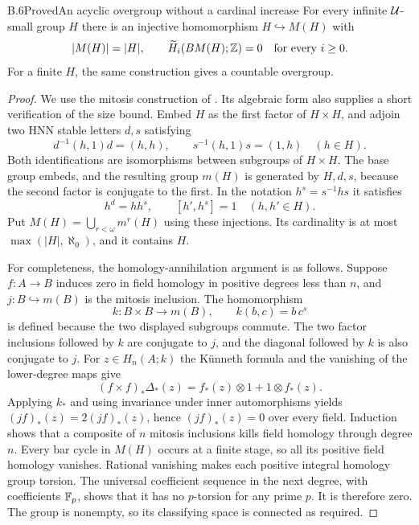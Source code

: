 \begin{claim}{B.6}{Proved}{An acyclic overgroup without a cardinal increase}
For every infinite $\mathcal U$-small group $H$ there is an injective
homomorphism $H\hookrightarrow M(H)$ with
\[
 |M(H)|=|H|,\qquad \widetilde H_i(BM(H);\mathbb Z)=0
 \quad\text{for every }i\geq0.
\]
For a finite $H$, the same construction gives a countable overgroup.
\end{claim}
\begin{proof}
We use the mitosis construction of
\citet[Proposition~4.1, Theorem~4.2, and Lemma~5.4]{BC_BDH1980}.
Its algebraic form also supplies a short verification of the size bound.
Embed $H$ as the first factor of $H\times H$, and adjoin two HNN stable
letters $d,s$ satisfying
\[
 d^{-1}(h,1)d=(h,h),\qquad s^{-1}(h,1)s=(1,h)
 \quad(h\in H).
\]
Both identifications are isomorphisms between subgroups of $H\times H$.
The base group embeds, and the resulting group $m(H)$ is generated by
$H,d,s$, because the second factor is conjugate to the first.  In the
notation $h^s=s^{-1}hs$ it satisfies
\[
 h^d=hh^s,\qquad [h',h^s]=1\quad(h,h'\in H).
\]
Put $M(H)=\bigcup_{r<\omega}m^r(H)$ using these injections.  Its
cardinality is at most $\max(|H|,\aleph_0)$, and it contains $H$.

For completeness, the homology-annihilation argument is as follows.
Suppose $f:A\to B$ induces zero in field homology in positive degrees
less than $n$, and $j:B\hookrightarrow m(B)$ is the mitosis inclusion.
The homomorphism
\[
 k:B\times B\longrightarrow m(B),\qquad k(b,c)=b\,c^s
\]
is defined because the two displayed subgroups commute.  The two factor
inclusions followed by $k$ are conjugate to $j$, and the diagonal
followed by $k$ is also conjugate to $j$.  For $z\in H_n(A;k)$ the
K\"unneth formula and the vanishing of the lower-degree maps give
\[
 (f\times f)_*\Delta_*(z)=f_*(z)\otimes1+1\otimes f_*(z).
\]
Applying $k_*$ and using invariance under inner automorphisms yields
$(jf)_*(z)=2(jf)_*(z)$, hence $(jf)_*(z)=0$ over every field.  Induction
shows that a composite of $n$ mitosis inclusions kills field homology
through degree $n$.  Every bar cycle in $M(H)$ occurs at a finite
stage, so all its positive field homology vanishes.  Rational vanishing
makes each positive integral homology group torsion.  The universal
coefficient sequence in the next degree, with coefficients $\mathbb F_p$,
shows that it has no $p$-torsion for any prime $p$.  It is therefore zero.
The group is nonempty, so its classifying space is connected as required.
\end{proof}

